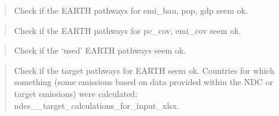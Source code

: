 \documentclass[letterpaper,10pt,english]{sphinxmanual}
\begin{document}
\begin{quote}

Check if the EARTH pathways for emi\_bau, pop, gdp seem ok.
\end{quote}

\begin{quote}

Check if the EARTH pathways for pc\_cov, emi\_cov seem ok.
\end{quote}

\begin{quote}

Check if the ‘used’ EARTH pathways seem ok.
\end{quote}

\begin{quote}

Check if the target pathways for EARTH seem ok.
Countries for which something (some emissions based on data provided within the NDC  or target emissions) were calculated: ndcs\_\_target\_calculations\_for\_input\_xlsx.
\end{quote}



\renewcommand{\indexname}{Index}
\printindex
\end{document}
